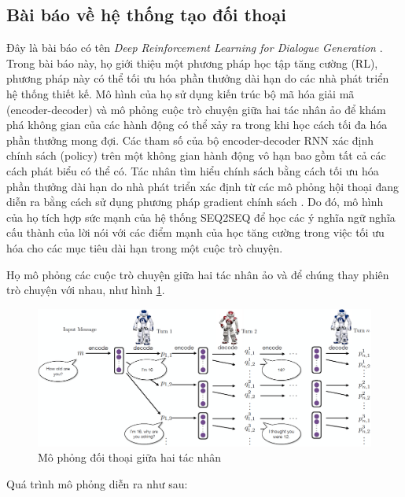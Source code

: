 \subsection{Bài báo về hệ thống tạo đối thoại}
Đây là bài báo có tên \textit{Deep Reinforcement Learning for Dialogue Generation} \cite{generation}. Trong bài báo này, họ giới thiệu một phương pháp học tập tăng cường (RL), phương pháp này có thể tối ưu hóa phần thưởng dài hạn do các nhà phát triển hệ thống thiết kế. Mô hình của họ sử dụng kiến trúc bộ mã hóa giải mã (encoder-decoder) và mô phỏng cuộc trò chuyện giữa hai tác nhân ảo để khám phá không gian của các hành động có thể xảy ra trong khi học cách tối đa hóa phần thưởng mong đợi. Các tham số của bộ encoder-decoder RNN xác định chính sách (policy) trên một không gian hành động vô hạn bao gồm tất cả các cách phát biểu có thể có. Tác nhân tìm hiểu chính sách bằng cách tối ưu hóa phần thưởng dài hạn do nhà phát triển xác định từ các mô phỏng hội thoại đang diễn ra bằng cách sử dụng phương pháp gradient chính sách \cite{gradient}. Do đó, mô hình của họ tích hợp sức mạnh của hệ thống SEQ2SEQ để học các ý nghĩa ngữ nghĩa cấu thành của lời nói với các điểm mạnh của học tăng cường trong việc tối ưu hóa cho các mục tiêu dài hạn trong một cuộc trò chuyện.

Họ mô phỏng các cuộc trò chuyện giữa hai tác nhân ảo và để chúng thay phiên trò chuyện với nhau, như hình \ref{fig:generation}.

\begin{center}
    \begin{figure}[ht!]
        \begin{center}
         \includegraphics[scale=0.4]{chapter2/img/generation.png}
        \end{center}
        \caption{Mô phỏng đối thoại giữa hai tác nhân}
        \label{fig:generation}
    \end{figure}
\end{center}

Quá trình mô phỏng diễn ra như sau:

